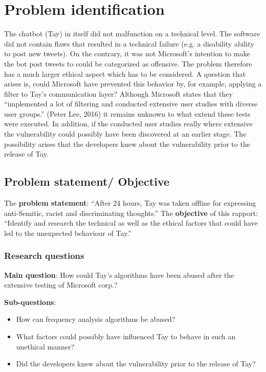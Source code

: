 \chapter{Problem identification}
The chatbot (Tay) in itself did not malfunction on a technical level. The software did not contain flaws that resulted in a technical failure (e.g. a disability ability to post new tweets). On the contrary, it was not Microsoft’s intention to make the bot post tweets to could be categorized as offensive. The problem therefore has a much larger ethical aspect which has to be considered.
A question that arises is, could Microsoft have prevented this behavior by, for example, applying a filter to Tay’s communication layer? Although Microsoft states that they “implemented a lot of filtering and conducted extensive user studies with diverse user groups.” (Peter Lee, 2016) it remains unknown to what extend these tests were executed. In addition, if the conducted user studies really where extensive the vulnerability could possibly have been discovered at an earlier stage. The possibility arises that the developers knew about the vulnerability prior to the release of Tay.

\newpage

\section{Problem statement/ Objective}
The \textbf{problem statement}: “After 24 hours, Tay was taken offline for expressing anti-Semitic, racist and discriminating thoughts.”
The \textbf{objective} of this rapport: “Identify and research the technical as well as the ethical factors that could have led to the unexpected behaviour of Tay.”

\subsection{Research questions}
\textbf{Main question}: How could Tay’s algorithms have been abused after the extensive testing of Microsoft corp.?

\textbf{Sub-questions}:
\begin{itemize}
	\item How can frequency analysis algorithms be abused?
	\item What factors could possibly have influenced Tay to behave in such an unethical manner?
	\item Did the developers knew about the vulnerability prior to the release of Tay?
\end{itemize}